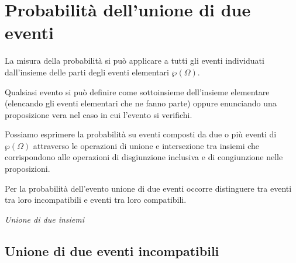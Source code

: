 \section{Probabilità dell'unione di due eventi}
\label{sec:09_unione}

La misura della probabilità si può applicare a tutti gli eventi individuati 
dall'insieme delle parti degli eventi elementari \(\wp (\Omega )\). 

\noindent\begin{minipage}{.58\textwidth}
Qualsiasi evento si può definire come sottoinsieme dell'insieme elementare 
(elencando gli eventi elementari che ne fanno parte) oppure enunciando una 
proposizione vera nel caso in cui l'evento si verifichi. 

Possiamo esprimere la probabilità su eventi composti da due o 
più eventi di \(\wp (\Omega )\) attraverso le operazioni di unione e 
intersezione tra insiemi che corrispondono alle operazioni di disgiunzione 
inclusiva e di congiunzione nelle proposizioni.

Per la probabilità dell'evento unione di due eventi occorre distinguere tra 
eventi tra loro incompatibili e eventi tra loro compatibili.
\end{minipage}
\hfill
\begin{minipage}[c]{.38\textwidth}
\begin{inaccessibleblock}
\begin{center} 
\unioneeventi
\emph{Unione di due insiemi}
\end{center}
\end{inaccessibleblock}
\end{minipage}

\subsection{Unione di due eventi incompatibili}

